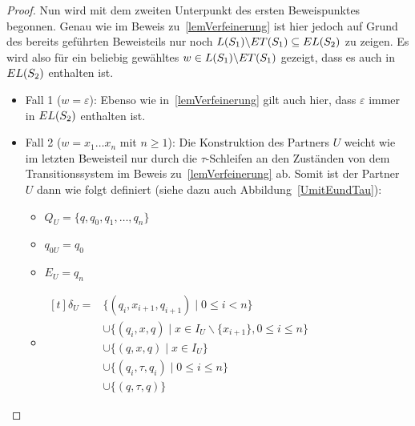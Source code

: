 \begin{proof}
  Nun wird mit dem zweiten Unterpunkt des ersten Beweispunktes begonnen. Genau
  wie im Beweis zu~\ref{lemVerfeinerung} ist hier jedoch auf Grund des bereits
  geführten Beweisteils nur noch $L(S_1)\backslash ET{}(S_1)\subseteq
  EL{}(S_2)$ zu zeigen. Es wird also für ein beliebig gewähltes $w\in
  L(S_1)\backslash ET{}(S_1)$ gezeigt, dass es auch in $EL{}(S_2)$ enthalten
  ist.
  \begin{itemize}
    \item Fall 1 ($w=\varepsilon$): Ebenso wie in~\ref{lemVerfeinerung} gilt
      auch hier, dass $\varepsilon$ immer in $EL{}(S_2)$ enthalten ist.
    \item Fall 2 ($w=x_1\dots x_n$ mit $n\geq 1$): Die Konstruktion des
      Partners $U$ weicht wie im letzten Beweisteil nur durch die
      $\tau$-Schleifen an den Zuständen von dem Transitionssystem im Beweis
      zu~\ref{lemVerfeinerung} ab. Somit ist der Partner $U$ dann wie folgt
      definiert (siehe dazu auch Abbildung~\ref{UmitEundTau}):
      \begin{itemize}
        \item $Q_U=\{q,q_0,q_1,\dots ,q_n\}$
        \item $q_{0U}=q_0$
        \item $E_U={q_n}$
        \item $\begin{aligned}[t]
            \delta _U=&\{(q_i,x_{i+1},q_{i+1})\mid 0\leq i< n\}\\
                      &\cup\{(q_i,x,q)\mid x\in I_U\backslash\{x_{i+1}\},0\leq
          i\leq n\}\\
          &\cup\{(q,x,q)\mid x\in I_U\}\\
          &\cup\{(q_i,\tau ,q_i)\mid 0\leq i\leq n\}\\
          &\cup\{(q,\tau ,q)\}
              \end{aligned}$
      \end{itemize}
      \begin{figure} [h!tbp]
      \begin{center}
\end{center}
\end{figure}
\end{itemize}
\end{proof}
